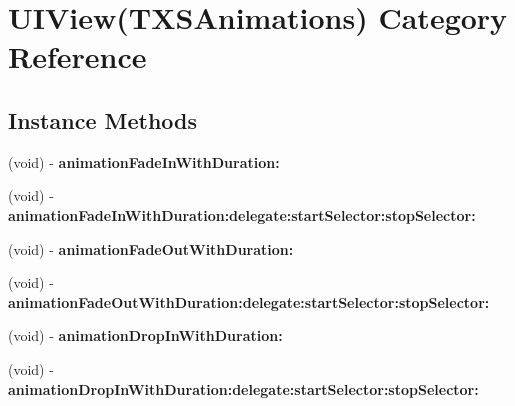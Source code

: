 \hypertarget{category_u_i_view_07_t_x_s_animations_08}{}\section{U\+I\+View(T\+X\+S\+Animations) Category Reference}
\label{category_u_i_view_07_t_x_s_animations_08}
\subsection*{Instance Methods}
\begin{DoxyCompactItemize}
\item 
\hypertarget{category_u_i_view_07_t_x_s_animations_08_a5554ae4376d5f2f996a86253edb0b5dc}{}(void) -\/ {\bfseries animation\+Fade\+In\+With\+Duration\+:}\label{category_u_i_view_07_t_x_s_animations_08_a5554ae4376d5f2f996a86253edb0b5dc}

\item 
\hypertarget{category_u_i_view_07_t_x_s_animations_08_a87c53da7e9541ef10f5ed3b8ac78b491}{}(void) -\/ {\bfseries animation\+Fade\+In\+With\+Duration\+:delegate\+:start\+Selector\+:stop\+Selector\+:}\label{category_u_i_view_07_t_x_s_animations_08_a87c53da7e9541ef10f5ed3b8ac78b491}

\item 
\hypertarget{category_u_i_view_07_t_x_s_animations_08_aab6614cf945358a27c43037eb5eea0f7}{}(void) -\/ {\bfseries animation\+Fade\+Out\+With\+Duration\+:}\label{category_u_i_view_07_t_x_s_animations_08_aab6614cf945358a27c43037eb5eea0f7}

\item 
\hypertarget{category_u_i_view_07_t_x_s_animations_08_aeae9aee2abe94496b79d80242943c6f2}{}(void) -\/ {\bfseries animation\+Fade\+Out\+With\+Duration\+:delegate\+:start\+Selector\+:stop\+Selector\+:}\label{category_u_i_view_07_t_x_s_animations_08_aeae9aee2abe94496b79d80242943c6f2}

\item 
\hypertarget{category_u_i_view_07_t_x_s_animations_08_ad3914e27916c8c8a8d946b5bc72dc138}{}(void) -\/ {\bfseries animation\+Drop\+In\+With\+Duration\+:}\label{category_u_i_view_07_t_x_s_animations_08_ad3914e27916c8c8a8d946b5bc72dc138}

\item 
\hypertarget{category_u_i_view_07_t_x_s_animations_08_ac941e2f11c041ed5aa32764327c177f6}{}(void) -\/ {\bfseries animation\+Drop\+In\+With\+Duration\+:delegate\+:start\+Selector\+:stop\+Selector\+:}\label{category_u_i_view_07_t_x_s_animations_08_ac941e2f11c041ed5aa32764327c177f6}


\end{DoxyCompactItemize}
